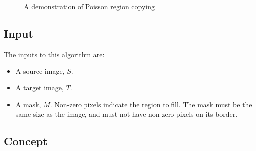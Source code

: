 \documentclass{InsightArticle}
\begin{document}
\begin{figure}[H]
\centering
{}
\caption{A demonstration of Poisson region copying}
\label{fig:RegionCopying}
\end{figure}

\subsection{Input}
The inputs to this algorithm are:
\begin{itemize}
\item A source image, $S$.
\item A target image, $T$.
\item A mask, $M$. Non-zero pixels indicate the region to fill. The mask must be the same size as the image, and must not have non-zero pixels on its border.
\end{itemize}

\subsection{Concept}
\end{document}
